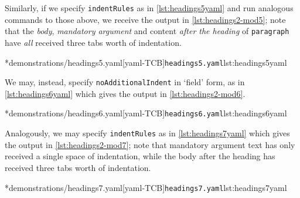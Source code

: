 	Similarly, if we specify \texttt{indentRules} as in \cref{lst:headings5yaml} and run analogous commands to those above, we receive the output in \cref{lst:headings2-mod5}; note that the \emph{body}, \emph{mandatory argument} and content \emph{after the heading} of \texttt{paragraph} have \emph{all} received three tabs worth of indentation.

	\begin{minipage}{.55\textwidth}
	\end{minipage}%
	\hfill
	\begin{minipage}{.42\textwidth}
		\cmhlistingsfromfile[style=yaml-LST]*{demonstrations/headings5.yaml}[yaml-TCB]{\texttt{headings5.yaml}}{lst:headings5yaml}
	\end{minipage}

	We may, instead, specify \texttt{noAdditionalIndent} in `field' form, as in \cref{lst:headings6yaml} which gives the output in \cref{lst:headings2-mod6}.

	\begin{minipage}{.45\textwidth}
	\end{minipage}%
	\hfill
	\begin{minipage}{.45\textwidth}
		\cmhlistingsfromfile[style=yaml-LST]*{demonstrations/headings6.yaml}[yaml-TCB]{\texttt{headings6.yaml}}{lst:headings6yaml}
	\end{minipage}

	Analogously, we may specify \texttt{indentRules} as in \cref{lst:headings7yaml} which gives the output in \cref{lst:headings2-mod7}; note that mandatory argument text has only received a single space of indentation, while the body after the heading has received three tabs worth of indentation.

	\begin{minipage}{.45\textwidth}
	\end{minipage}%
	\hfill
	\begin{minipage}{.45\textwidth}
		\cmhlistingsfromfile[style=yaml-LST]*{demonstrations/headings7.yaml}[yaml-TCB]{\texttt{headings7.yaml}}{lst:headings7yaml}
	\end{minipage}

